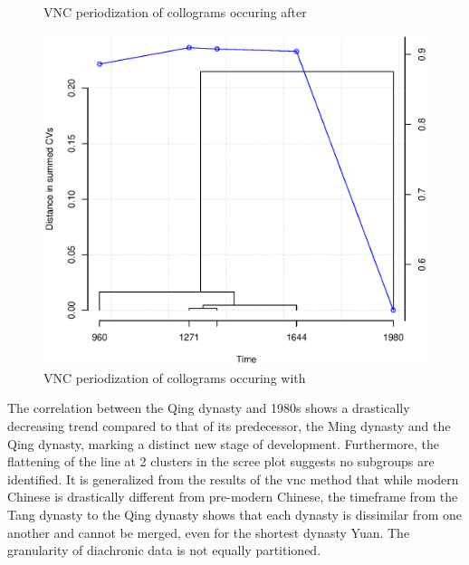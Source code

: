\begin{figure}[H]
\begin{minipage}[b]{0.3\linewidth}
  \caption{VNC periodization of collograms occuring after \jia}
  \label{fig:post_VNC}
\end{minipage}
\quad
\begin{minipage}[b]{0.3\linewidth}
  \includegraphics[width=\textwidth]{figures/all_VNC_cor.eps}
  \caption{VNC periodization of collograms occuring with \jia}
  \label{fig:all_VNC}
\end{minipage}
\end{figure}

The correlation between the Qing dynasty and 1980s shows a drastically decreasing trend compared to that of its predecessor, the Ming dynasty and the Qing dynasty, marking a distinct new stage of development. Furthermore, the flattening of the line at 2 clusters in the scree plot suggests no subgroups are identified. It is generalized from the results of the \gls{vnc} method that while modern Chinese is drastically different from pre-modern Chinese, the timeframe from the Tang dynasty to the Qing dynasty shows that each dynasty is dissimilar from one another and cannot be merged, even for the shortest dynasty Yuan. The granularity of diachronic data is not equally partitioned.


